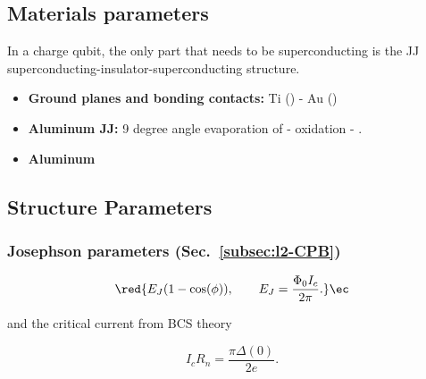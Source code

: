  \subsection{Materials parameters}
 \label{sec:materials-parameters}

\begin{framed}\noindent 
  In  a  charge   qubit,  the  only  part   that  needs  to  be  superconducting   is  the  JJ
  superconducting-insulator-superconducting structure.  \ec
\end{framed}

\begin{itemize}
\item \textbf{Ground planes and bonding contacts:} Ti () - Au ()
\item \textbf{Aluminum JJ:}  9 degree angle evaporation of   - 
  oxidation - .
\item \textbf{Aluminum }
\end{itemize}

\subsection{Structure Parameters}
\label{sec:structure-parameters}


\subsubsection{Josephson parameters (Sec.~\ref{subsec:l2-CPB})}
\label{sec:josephson-parameters}
\begin{equation}
  \label{eq:fabrication_jj_1}
  \red{E_J(1-\cos(\phi)),\qquad E_J = \frac{\Phi_0I_c}{2\pi}.}\ec
\end{equation}

\noindent and the critical current from BCS theory

\begin{equation}\label{eq:fabrication_jj_3}
  I_cR_n = \frac{\pi\Delta(0)}{2e}.
\end{equation}

